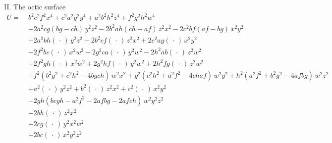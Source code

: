 \documentclass[11pt,a4paper]{article}
\begin{document}
\bigskip

\noindent II. The octic surface
\[
\begin{aligned}
U =\;& b^{2}c^{2}f^{2}x^{4} + c^{2}a^{2}g^{2}y^{4} + a^{2}b^{2}h^{2}z^{4} + f^{2}g^{2}h^{2}w^{4} \\
&- 2a^{2}cg(bg - ch)\, y^{2}z^{2} - 2b^{2}ah(ch - af)\, z^{2}x^{2} - 2c^{2}bf(af - bg)\, x^{2}y^{2} \\
&+ 2a^{2}bh(\,\cdot\,)\, y^{2}z^{2} + 2b^{2}cf(\,\cdot\,)\, z^{2}x^{2} + 2c^{2}ag(\,\cdot\,)\, x^{2}y^{2} \\
&- 2f^{2}bc(\,\cdot\,)\, x^{2}w^{2} - 2g^{2}ca(\,\cdot\,)\, y^{2}w^{2} - 2h^{2}ab(\,\cdot\,)\, z^{2}w^{2} \\
&+ 2f^{2}gh(\,\cdot\,)\, x^{2}w^{2} + 2g^{2}hf(\,\cdot\,)\, y^{2}w^{2} + 2h^{2}fg(\,\cdot\,)\, z^{2}w^{2} \\
&+ f^{2}(b^{2}g^{2} + c^{2}h^{2} - 4bgch)\, w^{2}x^{2} + g^{2}(c^{2}h^{2} + a^{2}f^{2} - 4chaf)\, w^{2}y^{2} + h^{2}(a^{2}f^{2} + b^{2}g^{2} - 4afbg)\, w^{2}z^{2} \\
&+ a^{2}(\,\cdot\,)\, y^{2}z^{2} + b^{2}(\,\cdot\,)\, z^{2}x^{2} + c^{2}(\,\cdot\,)\, x^{2}y^{2} \\
&- 2gh(bcgh - a^{2}f^{2} - 2afbg - 2afch)\, w^{2}y^{2}z^{2} \\
&- 2bh(\,\cdot\,)\, z^{2}x^{2} \\
&+ 2cg(\,\cdot\,)\, y^{2}x^{2}w^{2} \\
&+ 2bc(\,\cdot\,)\, x^{2}y^{2}z^{2}
\end{aligned}
\]

\newpage

\end{document}
